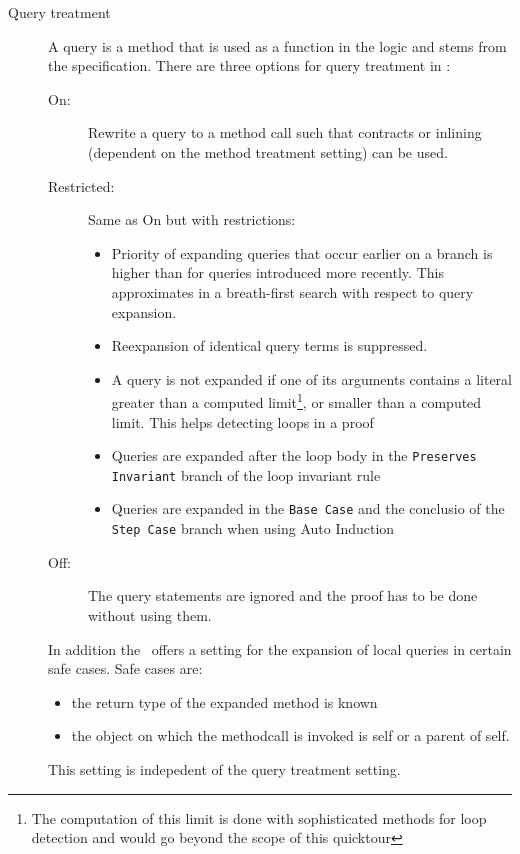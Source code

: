 \begin{description}
    
    \item[Query treatment] A query is a method that is used as a 
    function in the logic and stems from the specification.
    There are three options for query treatment in \KeY{}:
    \begin{description}
     \item[On:] Rewrite a query to a method call such that contracts 
     or inlining (dependent on the method treatment setting) can be used.
     \item[Restricted:] Same as \textsf{On} but with restrictions:
     \begin{itemize}
      \item Priority of expanding queries that occur earlier on a branch is higher than
	    for queries introduced more recently. This approximates in a breath-first search
	    with respect to query expansion.
      \item Reexpansion of identical query terms is suppressed.
      \item A query is not expanded if one of its arguments contains a literal greater
            than a computed limit\footnote{The computation of this limit is done with 
            sophisticated methods for loop detection and would go beyond the scope of this quicktour}, 
            or smaller than a computed limit. 
            This helps detecting loops in a proof
      \item Queries are expanded after the loop body in the \texttt{Preserves Invariant}
	    branch of the loop invariant rule
      \item Queries are expanded in the \texttt{Base Case} and the conclusio of the \texttt{Step Case}
	  branch when using Auto Induction
     \end{itemize}

     \item[Off:] The query statements are ignored and the proof has to be done without using them.
    \end{description}
    In addition the \kp\ offers a setting for the expansion 
    of local queries in certain safe cases. Safe cases are:
    \begin{itemize}
     \item the return type of the expanded method is known
     \item the object on which the methodcall is invoked is self or a parent of self.
    \end{itemize}
    This setting is indepedent of the query treatment setting.



\end{description}
